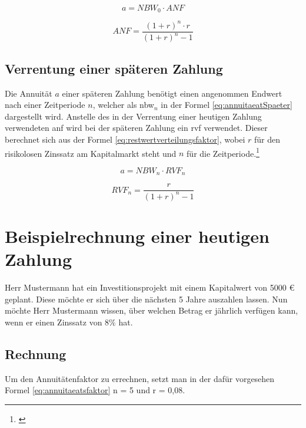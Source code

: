 \begin{equation}
    a = NBW_0 \cdot ANF
    \label{eq:annuitaeat}
\end{equation}

\begin{equation}
    ANF = \frac{ (1 + r)^n \cdot r }{ (1 + r)^n - 1 }
    \label{eq:annuitaeatsfaktor}
\end{equation}

\subsection{Verrentung einer späteren Zahlung}

Die Annuität $a$ einer späteren Zahlung benötigt einen angenommen Endwert nach einer Zeitperiode $n$, welcher als \ac{nbw}$_n$ in der Formel \eqref{eq:annuitaeatSpaeter} dargestellt wird. Anstelle des in der Verrentung einer heutigen Zahlung verwendeten \ac{anf} wird bei der späteren Zahlung ein \ac{rvf} verwendet. Dieser berechnet sich aus der Formel \eqref{eq:restwertverteilungsfaktor}, wobei $r$ für den risikolosen Zinssatz am Kapitalmarkt steht und $n$ für die Zeitperiode.\footnote{\cite{rechnungswesen-annu}}

\begin{equation}
    a = NBW_n \cdot RVF_n
    \label{eq:annuitaeatSpaeter}
\end{equation}

\begin{equation}
    RVF_n = \frac{ r }{ (1 + r)^n - 1 }
    \label{eq:restwertverteilungsfaktor}
\end{equation}


\section{Beispielrechnung einer heutigen Zahlung}

Herr Mustermann hat ein Investitionsprojekt mit einem Kapitalwert von 5000 € geplant. Diese möchte er sich über die nächsten 5 Jahre auszahlen lassen. Nun möchte Herr Mustermann wissen, über welchen Betrag er jährlich verfügen kann, wenn er einen Zinssatz von 8\% hat.


\subsection{Rechnung}

Um den Annuitätenfaktor zu errechnen, setzt man in der dafür vorgesehen Formel \eqref{eq:annuitaeatsfaktor} n = 5 und r = 0,08.

